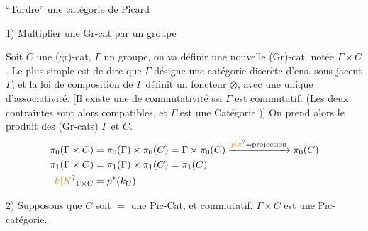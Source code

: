 ``Tordre'' une catégorie de Picard

1) Multiplier une Gr-cat par un groupe

Soit $C$ une (gr)-cat, $\Gamma$ un groupe, on va définir une nouvelle (Gr)-cat. notée $\Gamma\times C$. Le plus simple est de dire que $\Gamma$ désigne une catégorie discrète d'ens. sous-jacent $\Gamma$, et la loi de composition de $\Gamma$ définit un foncteur $\otimes$, avec une unique  d'associativité.  [Il existe une  de commutativité ssi $\Gamma$ est commutatif. (Les deux contraintes sont alors compatibles, et $\Gamma$ est une Catégorie )] On prend alors le produit des (Gr-cats) $\Gamma$ et $C$.
\[
\begin{aligned}
\pi_0(\Gamma\times C)&=\pi_0(\Gamma)\times\pi_0(C)=\Gamma\times\pi_0(C)\xrightarrow{\unsure{p|\pi}=\text{projection}}\pi_0(C)\\
\pi_1(\Gamma\times C)&=\pi_1(\Gamma)\times\pi_1(C)=\pi_1(C)\\
\unsure{k|K}_{\Gamma\times C}&=p^*(k_C)
\end{aligned}
\]

2) Supposons que $C$ soit $=$ une Pic-Cat, et \inserted{$\Gamma$} commutatif.  $\Gamma\times C$ est une Pic-catégorie.

